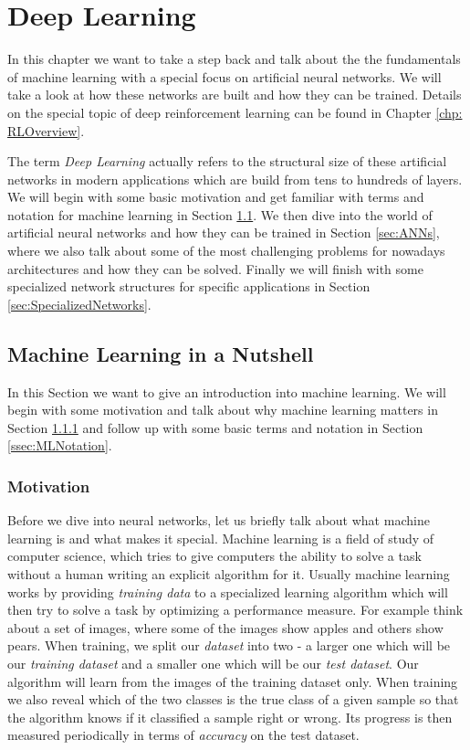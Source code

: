 \chapter{Deep Learning} \label{chp:DeepLearning}
In this chapter we want to take a step back and talk about the the fundamentals of machine learning with a special focus on artificial neural networks. We will take a look at how these networks are built and how they can be trained. Details on the special topic of deep reinforcement learning can be found in Chapter \ref{chp: RLOverview}.

The term \textit{Deep Learning} actually refers to the structural size of these artificial networks in modern applications which are build from tens to hundreds of layers. We will begin with some basic motivation and get familiar with terms and notation for machine learning in Section \ref{ssec:MLNutshell}. We then dive into the world of artificial neural networks and how they can be trained in Section \ref{sec:ANNs}, where we also talk about some of the most challenging problems for nowadays architectures and how they can be solved. Finally we will finish with some specialized network structures for specific applications in Section \ref{sec:SpecializedNetworks}.

\section{Machine Learning in a Nutshell} \label{ssec:MLNutshell}
In this Section we want to give an introduction into machine learning. We will begin with some motivation and talk about why machine learning matters in Section \ref{ssec:MLMotivation} and follow up with some basic terms and notation in Section \ref{ssec:MLNotation}.

\subsection{Motivation} \label{ssec:MLMotivation}
Before we dive into neural networks, let us briefly talk about what machine learning is and what makes it special. Machine learning is a field of study of computer science, which tries to give computers the ability to solve a task without a human writing an explicit algorithm for it. Usually machine learning works by providing \textit{training data} to a specialized learning algorithm which will then try to solve a task by optimizing a performance measure. For example think about a set of images, where some of the images show apples and others show pears. When training, we split our \textit{dataset} into two - a larger one which will be our \textit{training dataset} and a smaller one which will be our \textit{test dataset}. Our algorithm will learn from the images of the training dataset only. When training we also reveal which of the two classes is the true class of a given sample so that the algorithm knows if it classified a sample right or wrong. Its progress is then measured periodically in terms of \textit{accuracy} on the test dataset.

